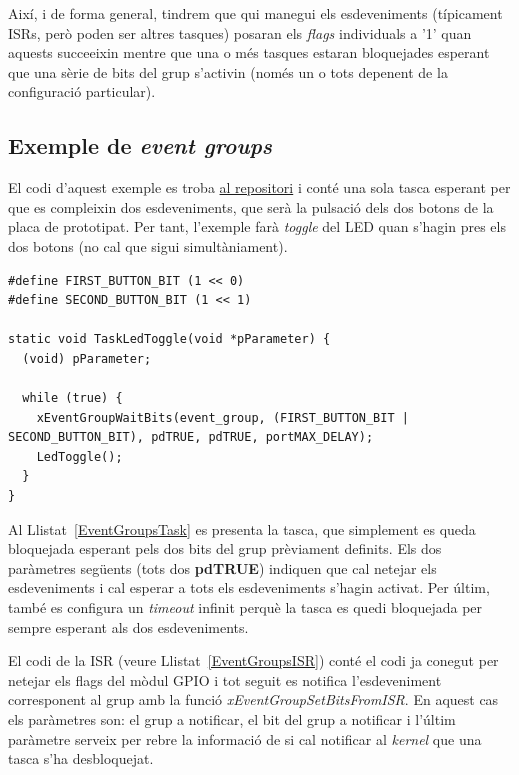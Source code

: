 Així, i de forma general, tindrem que qui manegui els esdeveniments  (típicament ISRs, però poden ser altres tasques) posaran els {\em flags} individuals a '1' quan aquests succeeixin mentre que una o més tasques estaran bloquejades esperant que una sèrie de bits del grup s'activin (només un o tots depenent de la configuració particular).

\subsection{Exemple de {\em event groups}}

El codi d'aquest exemple es troba \href{https://github.com/mariusmm/cursembedded/tree/master/Simplicity/FreeRTOS_EventGroups}{al repositori} i conté una sola tasca esperant per que es compleixin dos esdeveniments, que serà la pulsació dels dos botons de la placa de prototipat. Per tant, l'exemple farà {\em toggle} del LED quan s'hagin pres els dos botons (no cal que sigui simultàniament).

\begin{lstlisting}[style=customc,caption=Tasca esperant per un grup d'esdeveniments,label=EventGroupsTask]
#define FIRST_BUTTON_BIT (1 << 0)
#define SECOND_BUTTON_BIT (1 << 1)

static void TaskLedToggle(void *pParameter) {
  (void) pParameter;

  while (true) {
    xEventGroupWaitBits(event_group, (FIRST_BUTTON_BIT | SECOND_BUTTON_BIT), pdTRUE, pdTRUE, portMAX_DELAY);
    LedToggle();
  }
}
\end{lstlisting}

Al Llistat~\ref{EventGroupsTask} es presenta la tasca, que simplement es queda bloquejada esperant pels dos bits del grup prèviament definits. Els dos paràmetres següents (tots dos {\bf pdTRUE}) indiquen que cal  netejar els esdeveniments i cal esperar a tots els esdeveniments s'hagin activat. Per últim, també es configura un {\em timeout} infinit perquè la tasca es quedi bloquejada per sempre esperant als dos esdeveniments.

El codi de la ISR (veure Llistat~\ref{EventGroupsISR})  conté el codi ja conegut per netejar els flags del mòdul GPIO i tot seguit es notifica l'esdeveniment corresponent al grup amb la funció {\em xEventGroupSetBitsFromISR}. En aquest cas els paràmetres son: el grup a notificar, el bit del grup a notificar i l'últim paràmetre serveix per rebre la informació de si cal notificar al {\em kernel} que una tasca s'ha desbloquejat.


